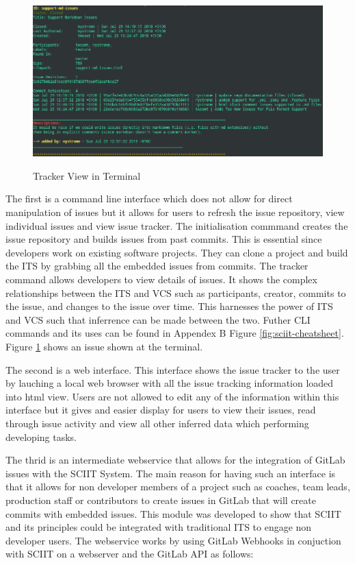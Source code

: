 \documentclass{mproj}
\begin{document}
\begin{figure}
\centering
  \caption{Tracker View in Terminal}
  \includegraphics[width=15cm]{sciit-tracker-shot}
  \label{fig:sciit-tracker-shot}
\end{figure}


The first is a command line interface which does not allow for direct manipulation of issues but it allows for users to refresh the issue repository, view individual issues and view issue tracker. The initialisation commmand creates the issue repository and builds issues from past commits. This is essential since developers work on existing software projects. They can clone a project and build the ITS by grabbing all the embedded issues from commits. The tracker command allows developers to view details of issues. It shows the complex relationships between the ITS and VCS such as participants, creator, commits to the issue, and changes to the issue over time. This harnesses the power of ITS and VCS such that inferrence can be made between the two. Futher CLI commands and its uses can be found in Appendex B Figure \ref{fig:sciit-cheatsheet}. Figure \ref{fig:sciit-tracker-shot} shows an issue shown at the terminal.

The second is a web interface. This interface shows the issue tracker to the user by lauching a local web browser with all the issue tracking information loaded into html view. Users are not allowed to edit any of the information within this interface but it gives and easier display for users to view their issues, read through issue activity and view all other inferred data which performing developing tasks.

The thrid is an intermediate webservice that allows for the integration of GitLab issues with the SCIIT System. The main reason for having such an interface is that it allows for non developer members of a project such as coaches, team leads, production staff or contributors to create issues in GitLab that will create commits with embedded issues. This module was developed to show that SCIIT and its principles could be integrated with traditional ITS to engage non developer users. The webservice works by using GitLab Webhooks in conjuction with SCIIT on a webserver and the GitLab API as follows:
\end{document}
